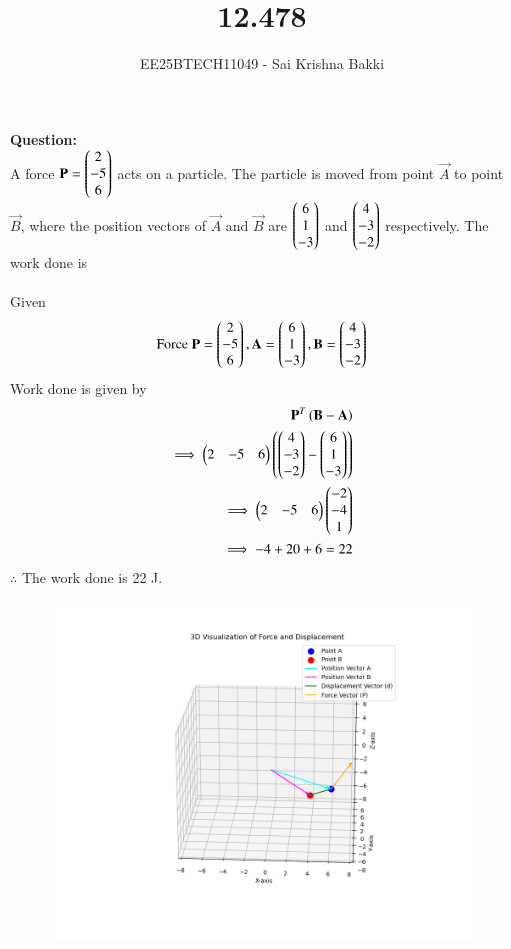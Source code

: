 \documentclass[journal]{IEEEtran}
\begin{document}

\vspace{3cm}

\title{12.478}
\author{EE25BTECH11049 - Sai Krishna Bakki}
\maketitle
\vspace{-3em}
\textbf{Question:}\\
A force $\mathbf{P}=\begin{pmatrix}2\\-5\\6\end{pmatrix}$ acts on a particle. The particle is moved from point $\vec{A}$ to point $\vec{B}$, where the position vectors of $\vec{A}$ and $\vec{B}$ are $\begin{pmatrix}6\\1\\-3\end{pmatrix}$ and $\begin{pmatrix}4\\-3\\-2\end{pmatrix}$ respectively. The work done is\\ 
\solution\\
Given
\begin{align}
    \text{Force } \mathbf{P}=\begin{pmatrix}2\\-5\\6\end{pmatrix},\mathbf{A}=\begin{pmatrix}6\\1\\-3\end{pmatrix},\mathbf{B}=\begin{pmatrix}4\\-3\\-2\end{pmatrix}
\end{align}
Work done is given by
\begin{align}
    \mathbf{P}^T\left(\mathbf{B}-\mathbf{A}\right)\\
    \implies \begin{pmatrix}2&-5&6\end{pmatrix}\left(\begin{pmatrix}4\\-3\\-2\end{pmatrix}-\begin{pmatrix}6\\1\\-3\end{pmatrix}\right)\\
    \implies \begin{pmatrix}2&-5&6\end{pmatrix}\begin{pmatrix}-2\\-4\\1\end{pmatrix}\\
    \implies -4+20+6=22
\end{align}
$\therefore$ The work done is 22 J.
\newpage
\begin{figure}
    \centering
    \includegraphics[width=1.1\columnwidth]{figs/Figure_1.png}
    \caption{}
    \label{fig:placeholder}
\end{figure}
\end{document}
